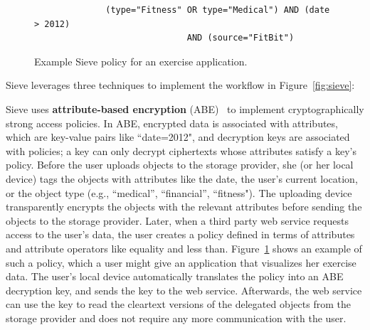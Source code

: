 \begin{figure}
\centering
\begin{verbatim}
              (type="Fitness" OR type="Medical") AND (date > 2012) 
                              AND (source="FitBit") 
\end{verbatim}
\caption[Example Sieve policy]{Example Sieve policy for an exercise application.}
\label{fig:policyex}
\end{figure}

Sieve leverages three techniques to implement
the workflow in Figure~\ref{fig:sieve}:\\
\begin{smitemize}
  \item Sieve uses \textbf{attribute-based encryption}
  (ABE)~\cite{kpabe} to implement cryptographically strong access
  policies. In ABE, encrypted data is 
  associated with attributes, which are key-value 
  pairs like ``date=2012", and decryption keys are 
  associated with policies; a key can only
  decrypt ciphertexts whose attributes satisfy a key's
  policy. Before the user uploads
  objects to the storage provider, she (or her local
  device) tags the objects with attributes like the
  date, the user's current location, or the object type
  (e.g., ``medical'', ``financial'', ``fitness").
  The uploading device transparently encrypts the objects
  with the relevant attributes before sending the objects to
  the storage provider. Later, when a third party web service 
  requests access to the user's data, the user creates a policy
  defined in terms of attributes and attribute
  operators like equality and less than. Figure~\ref{fig:policyex}
  shows an example of such a policy, which a user
  might give an application that visualizes her exercise data.
  The user's local device automatically translates the
  policy into an ABE decryption key, and sends the key
  to the web service. Afterwards, the web service can use
  the key to read the cleartext versions of the delegated
  objects from the storage provider and does not require
  any more communication with the user.
  

\end{smitemize}
